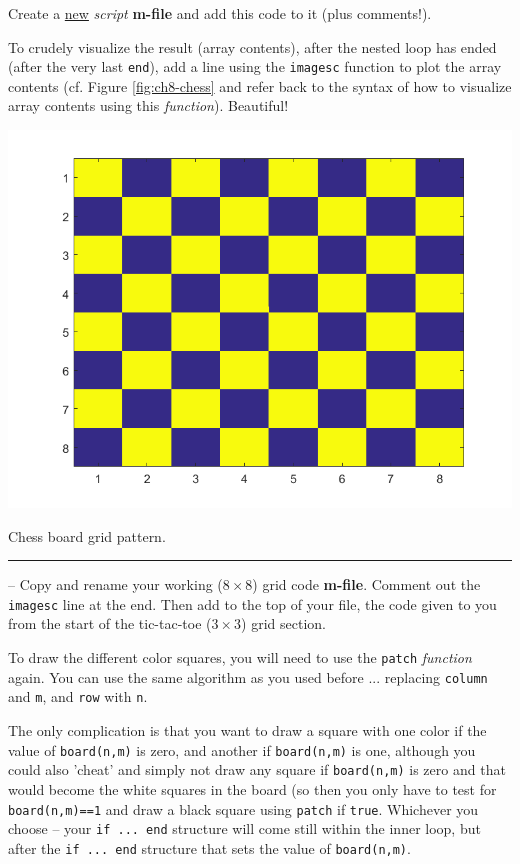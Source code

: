\documentclass{tufte-book} %
\begin{document}
Create a \uline{new} \textit{script} \textbf{m-file} and add this code to it (plus comments!).

To crudely visualize the result (array contents), after the nested loop has ended (after the very last \texttt{end}), add a line using the \texttt{imagesc} function to plot the array contents (cf. Figure \ref{fig:ch8-chess} and refer back to the syntax of how to visualize array contents using this \textit{function}). Beautiful!

\begin{marginfigure}[-1.0in]
\includegraphics[width=\linewidth]{ch8-chess.png}
\caption{Chess board grid pattern.}
\label{fig:ch8-chess}
\end{marginfigure}

\vspace{1mm}
\noindent\rule{4cm}{0.5pt}
\vspace{-2mm}

 -- Copy and rename your working (\(8\times8\)) grid code \textbf{m-file}. Comment out the \texttt{imagesc} line at the end. Then add to the top of your file, the code given to you from the  start of the tic-tac-toe (\(3\times3\)) grid section.

To draw the different color squares, you will need to use the \texttt{patch} \textit{function} again. You can use the same algorithm as you used before ... replacing \texttt{column} and \texttt{m}, and \texttt{row} with \texttt{n}.

The only complication is that you want to draw a square with one color if the value of \texttt{board(n,m)} is zero, and another if \texttt{board(n,m)} is one, although you could also 'cheat' and simply not draw any square if \texttt{board(n,m)} is zero and that would become the white squares in the board (so then you only have to test for \texttt{board(n,m)==1} and draw a black square using \texttt{patch} if \texttt{true}. Whichever you choose -- your \texttt{if ... end} structure will come still within the inner loop, but after the \texttt{if ... end} structure that sets the value of \texttt{board(n,m)}. 
\end{document}

